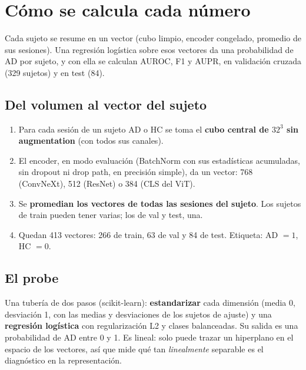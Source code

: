 \documentclass[11pt,a4paper]{article}
\begin{document}
\section{Cómo se calcula cada número}
\label{sec:metrics}

\begin{tldrbox}
Cada sujeto se resume en un vector (cubo limpio, encoder congelado, promedio de sus sesiones). Una
regresión logística sobre esos vectores da una probabilidad de AD por sujeto, y con ella se calculan
AUROC, F1 y AUPR, en validación cruzada (329 sujetos) y en test (84).
\end{tldrbox}

\subsection{Del volumen al vector del sujeto}

\begin{enumerate}
\item Para cada sesión de un sujeto AD o HC se toma el \textbf{cubo central de $32^3$ sin
  augmentation} (con todos sus canales).
\item El encoder, en modo evaluación (BatchNorm con sus estadísticas acumuladas, sin dropout ni drop
  path, en precisión simple), da un vector: 768 (ConvNeXt), 512 (ResNet) o 384 (CLS del ViT).
\item Se \textbf{promedian los vectores de todas las sesiones del sujeto}. Los sujetos de train
  pueden tener varias; los de val y test, una.
\item Quedan 413 vectores: 266 de train, 63 de val y 84 de test. Etiqueta: AD $=1$, HC $=0$.
\end{enumerate}

\subsection{El probe}

Una tubería de dos pasos (scikit-learn): \textbf{estandarizar} cada dimensión (media 0, desviación 1,
con las medias y desviaciones de los sujetos de ajuste) y una \textbf{regresión logística} con
regularización L2 y clases balanceadas. Su salida es una probabilidad de AD entre 0 y 1. Es lineal:
solo puede trazar un hiperplano en el espacio de los vectores, así que mide qué tan
\emph{linealmente} separable es el diagnóstico en la representación.
\end{document}
